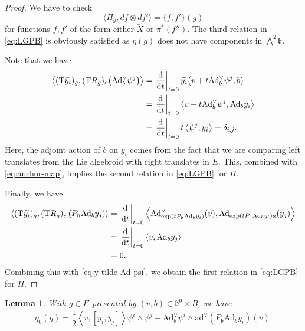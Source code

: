 \documentclass[a4paper,11pt]{amsart}
\newcommand{\fr}[1]{\mathfrak{#1}}
\newcommand{\rT}{\mathrm T}
\newcommand{\Ad}{\mathrm{Ad}}
\newcommand{\ad}{\mathrm{ad}}
\newcommand{\largewedge}{\bigwedge}
\newtheorem{lem}[thm]{Lemma}
\theoremstyle{definition}
\theoremstyle{remark}
\begin{document}
\begin{proof}
We have to check
\[
\langle \Pi_g, d f \otimes d f' \rangle = \{f, f'\}(g)
\]
for functions $f, f'$ of the form either $\tilde{X}$ or $\pi^*(f'')$.
The third relation in \eqref{eq:LGPB} is obviously satisfied as $\eta(g)$ does not have components in $\largewedge^2 \fr{b}$.

Note that we have
\begin{equation}
\label{eq:y-tilde-Ad-psi}
\begin{split}
\left\langle (\rT \widetilde{y_i})_g , (\rT R_g)_e \mathopen{} \left( \Ad^\vee_b \psi^j  \right)  \right\rangle
&= \left.\dv{t}\right|_{t=0} \widetilde{y_i} \mathopen{} \left( v + t \Ad^\vee_b \psi^j , b \right)\\
&= \left.\dv{t}\right|_{t=0} \left\langle v + t \Ad^\vee_b \psi^j , \Ad_b y_i \right\rangle\\
&= \left.\dv{t}\right|_{t=0} t \left\langle \psi^j , y_i \right\rangle
= \delta_{i,j}.
\end{split}
\end{equation}
Here, the adjoint action of $b$ on $y_i$ comes from the fact that we are comparing left translates from the Lie algebroid with right translates in $E$.
This, combined with \eqref{eq:anchor-map}, implies the second relation in \eqref{eq:LGPB} for $\Pi$.

Finally, we have
\[
\begin{split}
\left\langle (\rT \widetilde{y_i})_g , (\rT R_g)_e \left( P_{\fr{b}} \Ad_b y_j \right)  \right\rangle &= \left. \dv{t} \right|_{t=0} \left\langle \Ad^\vee_{\exp(t P_{\fr{b}}\Ad_b y_i)} (v) , \Ad_{\exp(t P_{\fr{b}}\Ad_b y_i)a} (y_j) \right\rangle \\
&= \left. \dv{t} \right|_{t=0} \left\langle v , \Ad_b y_j \right\rangle \\
&= 0 .
\end{split}
\]
Combining this with \eqref{eq:y-tilde-Ad-psi}, we obtain the first relation in \eqref{eq:LGPB} for $\Pi$.
\end{proof}

\begin{lem}
With $g \in E$ presented by $(v, b) \in \fr{b}^0 \times B$, we have
\begin{equation}
\eta_0(g) = \frac{1}{2} \left\langle v , \left[ y_i , y_j \right] \right\rangle \psi^i \wedge \psi^j - \Ad^\vee_b \psi^i \wedge \ad^\vee ( P_{\fr{b}}\Ad_b y_i ) (v) . \label{eq:AEFLP}
\end{equation}
\end{lem}
\end{document}
